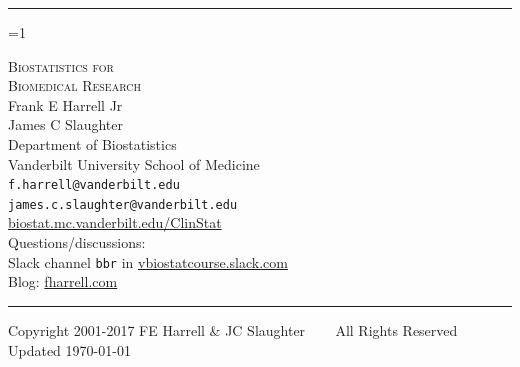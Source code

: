 \documentclass{report}
\begin{document}
\author{ }

\noindent\rule{\linewidth}{1mm}

\def\originalBBR{0}  %
\ifnum\originalBBR=1

\begin{flushright}
\Huge
\textsc{Biostatistics for\\Biomedical Research}\\[2ex]
\huge Frank E Harrell Jr \\ James C Slaughter \\
\Large
Department of Biostatistics \\
Vanderbilt University School of Medicine \\
\texttt{f.harrell@vanderbilt.edu} \\ \texttt{james.c.slaughter@vanderbilt.edu}
\\[2ex] \url{biostat.mc.vanderbilt.edu/ClinStat}\\
Questions/discussions:\\Slack channel \texttt{bbr} in 
\href{http://vbiostatcourse.slack.com}{vbiostatcourse.slack.com}\\
Blog: \href{http://fharrell.com}{fharrell.com}
\\[2ex]
\small
\end{flushright}
\rule{\linewidth}{1mm}
\begin{center}
\vspace{.5in}
\small
Copyright 2001-2017 FE Harrell \& JC Slaughter ~~~ All Rights Reserved
\\ \hfill \scriptsize Updated \today
\end{center}

\else %
\end{document}

